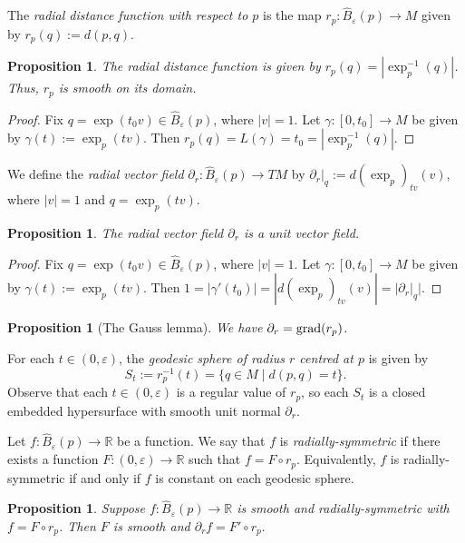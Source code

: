 \documentclass{amsart}
\newcommand{\R}{\mathbb R}
\newcommand{\grad}{\text{\normalfont grad}}
\theoremstyle{plain}
\newtheorem{proposition}[theorem]{Proposition}
\theoremstyle{definition}
\theoremstyle{remark}
\begin{document}
	The \emph{radial distance function with respect to $p$} is the map $r_p: \widehat B_\varepsilon(p) \rightarrow M$ given by $r_p(q) := d(p,q)$. 
	\begin{proposition}
		The radial distance function is given by $r_p(q) = |\exp_p^{-1}(q)|$. Thus, $r_p$ is smooth on its domain. 
	\end{proposition}
	\begin{proof}
		 Fix $q = \exp(t_0v) \in \widehat B_\varepsilon(p)$, where $|v| = 1$. Let $\gamma:[0,t_0] \rightarrow M$ be given by $\gamma(t) := \exp_p(tv)$. Then $r_p(q) = L(\gamma) = t_0 = |\exp_p^{-1}(q)|$.  
	\end{proof}

	We define the \emph{radial vector field} $\partial_r:\widehat B_\varepsilon(p) \rightarrow TM$ by $\partial_r|_q := d(\exp_p)_{tv}(v)$, where $|v| = 1$ and $q = \exp_p(tv)$.
	\begin{proposition}
		The radial vector field $\partial_r$ is a unit vector field.
	\end{proposition}
	\begin{proof}
		Fix $q = \exp(t_0v) \in \widehat B_\varepsilon(p)$, where $|v| = 1$. Let $\gamma:[0,t_0] \rightarrow M$ be given by $\gamma(t) := \exp_p(tv)$. Then $1 = |\gamma'(t_0)| = |d(\exp_p)_{tv}(v)| = |\partial_r|_q|$.
	\end{proof}
	\begin{proposition}[The Gauss lemma]
		 We have $\partial_r = \grad(r_p)$.
	\end{proposition}
	
	For each $t \in (0,\varepsilon)$, the \emph{geodesic sphere of radius $r$ centred at $p$} is given by $$S_t := r_p^{-1}(t) = \Big\{q \in M \;\Big|\; d(p,q) = t\Big\}.$$
	Observe that each $t \in (0,\varepsilon)$ is a regular value of $r_p$, so each  $S_t$ is a closed embedded hypersurface with smooth unit normal $\partial_r$.
	
	Let $f: \widehat B_\varepsilon(p) \rightarrow \R$ be a function. We say that $f$ is \emph{radially-symmetric} if there exists a function $F:(0,\varepsilon) \rightarrow \R$ such that $f = F \circ r_p$. Equivalently, $f$ is radially-symmetric if and only if $f$ is constant on each geodesic sphere.
	
	\begin{proposition}
		Suppose $f: \widehat B_\varepsilon(p) \rightarrow \R$ is smooth and radially-symmetric with $f = F \circ r_p$. Then $F$ is smooth and 
		$\partial_r f = F' \circ r_p.$
	\end{proposition}
	
\end{document}
